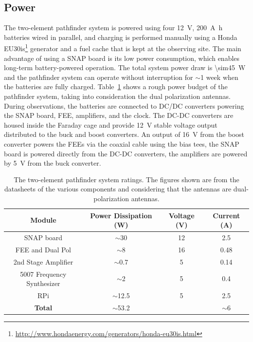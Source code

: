 \subsection{Power}
The two-element pathfinder system is powered using four \SI{12}{\volt}, \SI{200}{\ampere\hour} batteries wired in parallel, and charging is performed manually using a Honda EU30is\footnote {\url{http://www.hondaenergy.com/generators/honda-eu30is.html}} generator and a fuel cache that is kept at the observing site. The main advantage of using a SNAP board is its low power consumption, which enables long-term battery-powered operation. The total system power draw is \SI{\sim45}{\watt} and the pathfinder system can operate without interruption for $\sim$1 week when the batteries are fully charged. Table~\ref{table:budget} shows a rough power budget of the pathfinder system, taking into consideration the dual polarization antennas. During observations, the batteries are connected to DC/DC converters powering the SNAP board, FEE, amplifiers, and the clock. The DC-DC converters are housed inside the Faraday cage and provide \SI{12}{\volt} stable voltage output distributed to the buck and boost converters. An output of \SI{16}{\volt} from the boost converter powers the FEEs via the coaxial cable using the bias tees, the SNAP board is powered directly from the DC-DC converters, the amplifiers are powered by \SI{5}{\volt} from the buck converter.

\begin{table}
	\centering
	\begin{tabular}{|c | c | c | c |} 
		\hline
		Module & Power Dissipation (W) &  Voltage (V) & Current (A)\\  
		\hline
		SNAP board & $\sim$30 & 12 & 2.5\\
		\hline
		FEE and Dual Pol & $\sim$8 & 16 & 0.48 \\
		\hline
		2nd Stage Amplifier & $\sim$0.7 & 5 & 0.14\\
		\hline
		5007 Frequency Synthesizer & $\sim$2 & 5 & 0.4\\
		\hline
		RPi & $\sim$12.5 & 5 & 2.5 \\
		\hline
		\textbf{Total} & $\sim$53.2 &  & $\sim$6 \\
		\hline
	\end{tabular}
	\caption{The two-element pathfinder system ratings. The figures shown are from the datasheets of the various components and considering that the antennas are dual-polarization antennas.}
	\label{table:budget}
\end{table}

